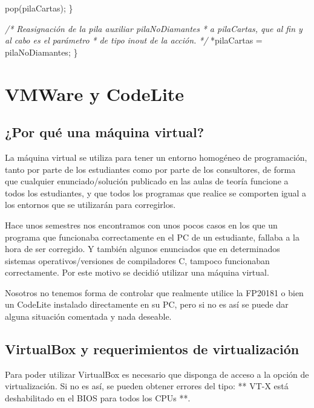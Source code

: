 \documentclass[
]{book}
\newenvironment{Shaded}{\begin{snugshade}}{\end{snugshade}}
\newcommand{\CommentTok}[1]{\textcolor[rgb]{0.56,0.35,0.01}{\textit{#1}}}
\newcommand{\NormalTok}[1]{#1}
\begin{document}
\begin{Shaded}
\begin{Highlighting}[]
\NormalTok{        pop(pilaCartas);}
\NormalTok{    \}}
    
    \CommentTok{/* Reasignación de la pila auxiliar pilaNoDiamantes}
\CommentTok{     * a pilaCartas, que al fin y al cabo es el parámetro}
\CommentTok{     * de tipo inout de la acción.}
\CommentTok{     */}
\NormalTok{    *pilaCartas = pilaNoDiamantes;}
\NormalTok{\}}
\end{Highlighting}
\end{Shaded}

\hypertarget{vmware-y-codelite}{%
\chapter{VMWare y CodeLite}\label{vmware-y-codelite}}

\hypertarget{por-quuxe9-una-muxe1quina-virtual}{%
\section{¿Por qué una máquina virtual?}\label{por-quuxe9-una-muxe1quina-virtual}}

La máquina virtual se utiliza para tener un entorno homogéneo de programación, tanto por parte de los estudiantes como por parte de los consultores, de forma que cualquier enunciado/solución publicado en las aulas de teoría funcione a todos los estudiantes, y que todos los programas que realice se comporten igual a los entornos que se utilizarán para corregirlos.

Hace unos semestres nos encontramos con unos pocos casos en los que un programa que funcionaba correctamente en el PC de un estudiante, fallaba a la hora de ser corregido. Y también algunos enunciados que en determinados sistemas operativos/versiones de compiladores C, tampoco funcionaban correctamente. Por este motivo se decidió utilizar una máquina virtual.

Nosotros no tenemos forma de controlar que realmente utilice la FP20181 o bien un CodeLite instalado directamente en su PC, pero si no es así se puede dar alguna situación comentada y nada deseable.

\hypertarget{virtualbox-y-requerimientos-de-virtualizaciuxf3n}{%
\section{VirtualBox y requerimientos de virtualización}\label{virtualbox-y-requerimientos-de-virtualizaciuxf3n}}

Para poder utilizar VirtualBox es necesario que disponga de acceso a la opción de virtualización. Si no es así, se pueden obtener errores del tipo: ** VT-X está deshabilitado en el BIOS para todos los CPUs **.
\end{document}
